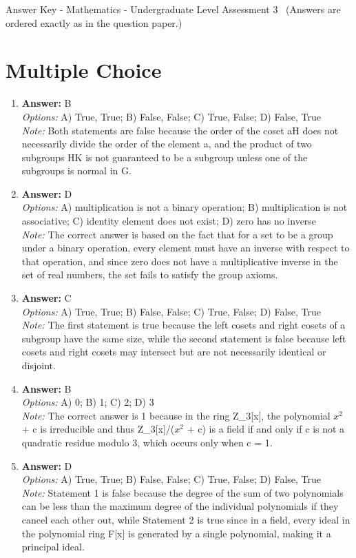 \documentclass[12pt]{article}
\begin{document}
\begin{center}
Answer Key - Mathematics - Undergraduate Level Assessment 3 \
\small (Answers are ordered exactly as in the question paper.)
\end{center}

\section*{Multiple Choice}
\begin{enumerate}[label=\arabic*.]
\item \textbf{Answer:} B
\\ \textit{Options:} A) True, True; B) False, False; C) True, False; D) False, True
\\ \textit{Note:} Both statements are false because the order of the coset aH does not necessarily divide the order of the element a, and the product of two subgroups HK is not guaranteed to be a subgroup unless one of the subgroups is normal in G.
\item \textbf{Answer:} D
\\ \textit{Options:} A) multiplication is not a binary operation; B) multiplication is not associative; C) identity element does not exist; D) zero has no inverse
\\ \textit{Note:} The correct answer is based on the fact that for a set to be a group under a binary operation, every element must have an inverse with respect to that operation, and since zero does not have a multiplicative inverse in the set of real numbers, the set fails to satisfy the group axioms.
\item \textbf{Answer:} C
\\ \textit{Options:} A) True, True; B) False, False; C) True, False; D) False, True
\\ \textit{Note:} The first statement is true because the left cosets and right cosets of a subgroup have the same size, while the second statement is false because left cosets and right cosets may intersect but are not necessarily identical or disjoint.
\item \textbf{Answer:} B
\\ \textit{Options:} A) 0; B) 1; C) 2; D) 3
\\ \textit{Note:} The correct answer is 1 because in the ring Z\_3[x], the polynomial $x^2$ + c is irreducible and thus Z\_3[x]/($x^2$ + c) is a field if and only if c is not a quadratic residue modulo 3, which occurs only when c = 1.
\item \textbf{Answer:} D
\\ \textit{Options:} A) True, True; B) False, False; C) True, False; D) False, True
\\ \textit{Note:} Statement 1 is false because the degree of the sum of two polynomials can be less than the maximum degree of the individual polynomials if they cancel each other out, while Statement 2 is true since in a field, every ideal in the polynomial ring F[x] is generated by a single polynomial, making it a principal ideal.
\end{enumerate}
\end{document}

